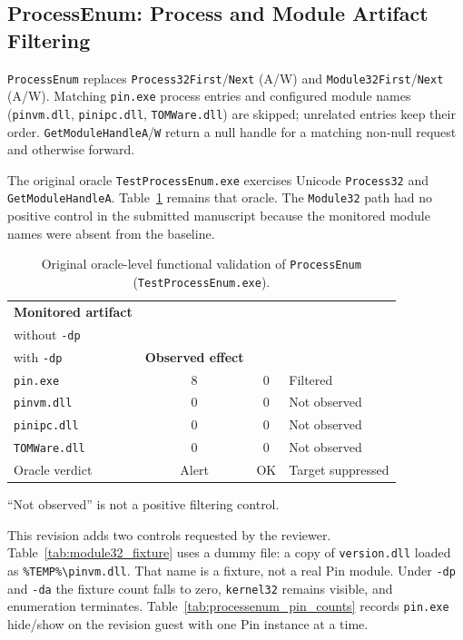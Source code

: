 \documentclass[pdflatex,sn-mathphys-num]{sn-jnl}
\theoremstyle{thmstyleone}
\theoremstyle{thmstyletwo}
\theoremstyle{thmstylethree}
\begin{document}
\subsection{ProcessEnum: Process and Module Artifact Filtering}
\label{subsec:processenum_implementation}

\texttt{ProcessEnum} replaces \texttt{Process32First}/\texttt{Next} (A/W) and \texttt{Module32First}/\texttt{Next} (A/W). Matching \texttt{pin.exe} process entries and configured module names (\texttt{pinvm.dll}, \texttt{pinipc.dll}, \texttt{TOMWare.dll}) are skipped; unrelated entries keep their order. \texttt{GetModuleHandleA}/\texttt{W} return a null handle for a matching non-null request and otherwise forward.

The original oracle \texttt{TestProcessEnum.exe} exercises Unicode \texttt{Process32} and \texttt{GetModuleHandleA}. Table~\ref{tab:processenum_validation} remains that oracle. The \texttt{Module32} path had no positive control in the submitted manuscript because the monitored module names were absent from the baseline.

\begin{table}[t]
\caption{Original oracle-level functional validation of \texttt{ProcessEnum} (\texttt{TestProcessEnum.exe}).}
\label{tab:processenum_validation}
\centering
\small
\begin{tabularx}{\columnwidth}{@{}Xccp{}@{}}
\toprule
\textbf{Monitored artifact} & \shortstack{\textbf{Baseline}\\without \texttt{-dp}} & \shortstack{\textbf{ProcessEnum}\\with \texttt{-dp}} & \textbf{Observed effect} \\
\midrule
\texttt{pin.exe} & 8 & 0 & Filtered \\
\texttt{pinvm.dll} & 0 & 0 & Not observed \\
\texttt{pinipc.dll} & 0 & 0 & Not observed \\
\texttt{TOMWare.dll} & 0 & 0 & Not observed \\
Oracle verdict & Alert & OK & Target suppressed \\
\bottomrule
\end{tabularx}
\vspace{3pt}
\parbox{\columnwidth}{\footnotesize ``Not observed'' is not a positive filtering control.}
\end{table}

This revision adds two controls requested by the reviewer. Table~\ref{tab:module32_fixture} uses a dummy file: a copy of \texttt{version.dll} loaded as \texttt{\%TEMP\%\textbackslash pinvm.dll}. That name is a fixture, not a real Pin module. Under \texttt{-dp} and \texttt{-da} the fixture count falls to zero, \texttt{kernel32} remains visible, and enumeration terminates. Table~\ref{tab:processenum_pin_counts} records \texttt{pin.exe} hide/show on the revision guest with one Pin instance at a time.
\end{document}
